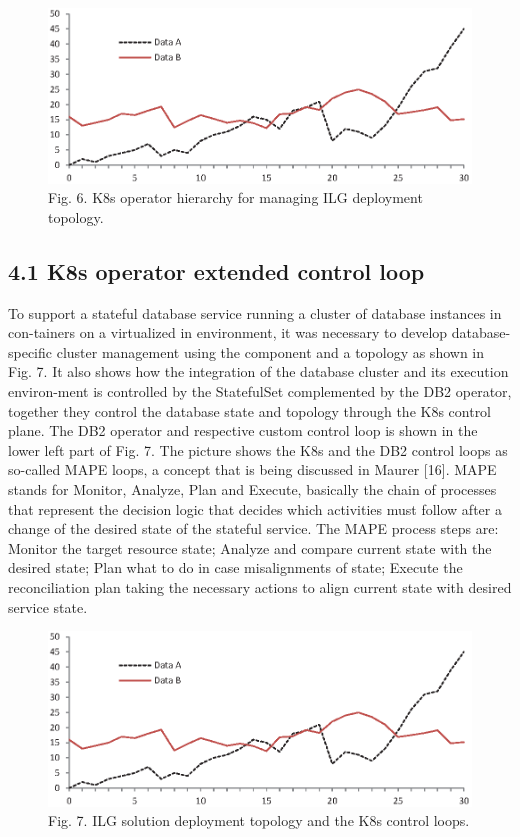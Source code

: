 \documentclass[runningheads]{llncs}
\begin{document}
\begin{figure}
\includegraphics[width=\textwidth]{fig1.eps}
\caption{Fig. 6. K8s operator hierarchy for managing ILG deployment topology.} \label{fig6}
\end{figure}

\subsection{4.1	K8s operator extended control loop}
To support a stateful database service running a cluster of database instances in con-tainers on a virtualized in environment, it was necessary to develop database-specific cluster management using the component and a topology as shown in Fig. 7. It also shows how the integration of the database cluster and its execution environ-ment is controlled by the StatefulSet complemented by the DB2 operator, together they control the database state and topology through the K8s control plane. The DB2 operator and respective custom control loop is shown in the lower left part of Fig. 7. 
The picture shows the K8s and the DB2 control loops as so-called MAPE loops, a concept that is being discussed in Maurer [16]. MAPE stands for Monitor, Analyze, Plan and Execute, basically the chain of processes that represent the decision logic that decides which activities must follow after a change of the desired state of the stateful service. The MAPE process steps are: Monitor the target resource state; Analyze and compare current state with the desired state; Plan what to do in case misalignments of state; Execute the reconciliation plan taking the necessary actions to align current state with desired service state.

\begin{figure}
\includegraphics[width=\textwidth]{fig1.eps}
\caption{Fig. 7. ILG solution deployment topology and the K8s control loops.} \label{fig7}
\end{figure}
\end{document}
